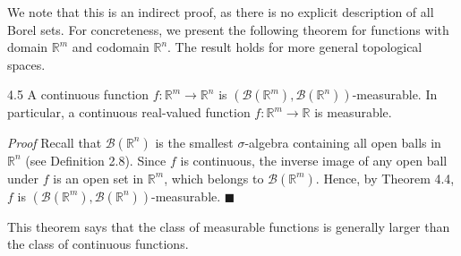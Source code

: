 We note that this is an indirect proof, as there is no explicit description of all Borel sets. For concreteness, we present the following theorem for functions with domain $\mathbb{R}^m$ and codomain $\mathbb{R}^n$. The result holds for more general topological spaces.

\begin{thmbox}{4.5}
A continuous function $f : \mathbb{R}^m \to \mathbb{R}^n$ is $(\mathcal{B}(\mathbb{R}^m), \mathcal{B}(\mathbb{R}^n))$-measurable. In particular, a continuous real-valued function $f : \mathbb{R}^m \to \mathbb{R}$ is measurable.
\end{thmbox}

\noindent\textit{Proof} Recall that $\mathcal{B}(\mathbb{R}^n)$ is the smallest $\sigma$-algebra containing all open balls in $\mathbb{R}^n$ (see Definition 2.8). Since $f$ is continuous, the inverse image of any open ball under $f$ is an open set in $\mathbb{R}^m$, which belongs to $\mathcal{B}(\mathbb{R}^m)$. Hence, by Theorem 4.4, $f$ is $(\mathcal{B}(\mathbb{R}^m), \mathcal{B}(\mathbb{R}^n))$-measurable. \hfill $\blacksquare$

This theorem says that the class of measurable functions is generally larger than the class of continuous functions.